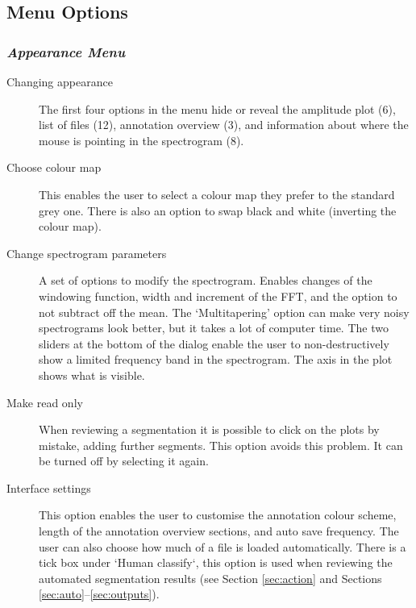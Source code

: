 \documentclass{article}
\begin{document}
\subsection{Menu Options}	

\subsubsection{{\em Appearance Menu}}

\begin{description}
\item [Changing appearance] The first four options in the menu hide or reveal the amplitude plot (6), list of files (12), annotation overview (3), and information about where the mouse is pointing in the spectrogram (8). 
\item [Choose colour map] This enables the user to select a colour map they prefer to the standard grey one. There is also an option to swap black and white (inverting the colour map). 
\item [Change spectrogram parameters] A set of options to modify the spectrogram. Enables changes of the windowing function, width and increment of the FFT, and the option to not subtract off the mean. The `Multitapering' option can make very noisy spectrograms look better, but it takes a lot of computer time. The two sliders at the bottom of the dialog enable the user to non-destructively show a limited frequency band in the spectrogram. The axis in the plot shows what is visible. 
\item [Make read only] When reviewing a segmentation it is possible to click on the plots by mistake, adding further segments. This option avoids this problem. It can be turned off by selecting it again. 
\item [Interface settings] This option enables the user to customise the annotation colour scheme, length of the annotation overview sections, and auto save frequency. The user can also choose how much of a file is loaded automatically. There is a tick box under `Human classify`, this option is used when reviewing the automated segmentation results  (see Section \ref{sec:action} and Sections \ref{sec:auto}--\ref{sec:outputs}).


\end{description}
\end{document}
